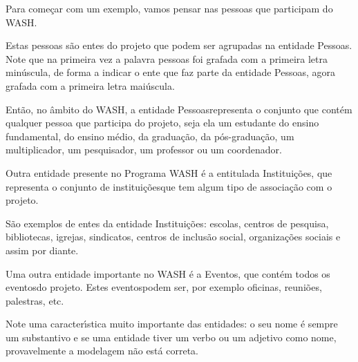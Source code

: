 \documentclass[
12pt,		%
openright,	%
twoside,  %
a4paper,			%
chapter=TITLE,		%
english,			%
french,				%
spanish,			%
brazil				%
]{USPSC-classe/USPSC}
\begin{document}
Para come\c{c}ar com um exemplo, vamos pensar nas \textquotedbl pessoas que participam do WASH\textquotedbl .




Estas pessoas s\~ao entes do projeto que podem ser agrupadas na entidade \textquotedbl Pessoas\textquotedbl . Note que na primeira vez a palavra pessoas foi grafada com a primeira letra min\'uscula, de forma a indicar o ente que faz parte da entidade \textquotedbl Pessoas\textquotedbl , agora grafada com a primeira letra mai\'uscula.




Ent\~ao, no \^ambito do WASH, a entidade \textquotedbl Pessoas\textquotedbl  representa o conjunto que cont\'em qualquer pessoa que participa do projeto, seja ela um estudante do ensino fundamental, do ensino m\'edio, da gradua\c{c}\~ao, da p\'os-gradua\c{c}\~ao, um multiplicador, um pesquisador, um professor ou um coordenador.




Outra entidade presente no Programa WASH \'e a entitulada \textquotedbl Institui\c{c}\~oes\textquotedbl , que representa o conjunto de \textquotedbl institui\c{c}\~oes\textquotedbl  que tem algum tipo de associa\c{c}\~ao com o projeto.




S\~ao exemplos de entes da entidade \textquotedbl Institui\c{c}\~oes\textquotedbl : escolas, centros de pesquisa, bibliotecas, igrejas, sindicatos, centros de inclus\~ao social, organiza\c{c}\~oes sociais e assim por diante.




Uma outra entidade importante no WASH \'e a \textquotedbl Eventos\textquotedbl , que cont\'em todos os \textquotedbl eventos\textquotedbl  do projeto. Estes \textquotedbl eventos\textquotedbl  podem ser, por exemplo \textquotedbl oficinas\textquotedbl , \textquotedbl reuni\~oes\textquotedbl , \textquotedbl palestras\textquotedbl , etc.




Note uma caracter\'{\i}stica muito importante das entidades: o seu nome \'e sempre um substantivo e se uma entidade tiver um verbo ou um adjetivo como nome, provavelmente a modelagem n\~ao est\'a correta.





\noindent\begin{center}\mbox{\centering{}}\end{center}
\end{document}
